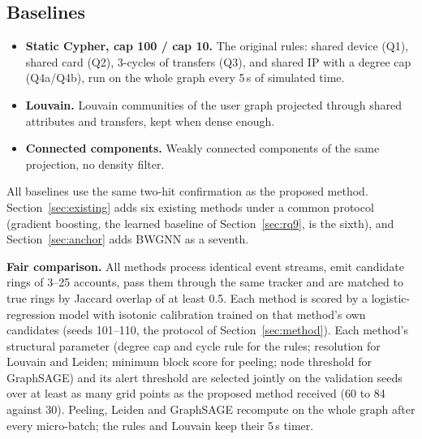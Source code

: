 \subsection{Baselines}
\begin{itemize}
\item \textbf{Static Cypher, cap 100 / cap 10.} The original rules: shared
device (Q1), shared card (Q2), 3-cycles of transfers (Q3), and shared IP with a
degree cap (Q4a/Q4b), run on the whole graph every 5\,s of simulated time.
\item \textbf{Louvain.} Louvain communities \cite{blondel2008louvain} of the
user graph projected through shared attributes and transfers, kept when dense
enough.
\item \textbf{Connected components.} Weakly connected components of the same
projection, no density filter.
\end{itemize}
All baselines use the same two-hit confirmation as the proposed method.
Section~\ref{sec:existing} adds six existing methods under a common protocol (gradient boosting, the learned baseline of Section~\ref{sec:rq9}, is the sixth), and Section~\ref{sec:anchor} adds BWGNN as a seventh.

\textbf{Fair comparison.} All methods process identical event streams, emit
candidate rings of 3--25 accounts, pass them through the same tracker and are
matched to true rings by Jaccard overlap of at least 0.5. Each method is scored
by a logistic-regression model with isotonic calibration trained on that
method's own candidates (seeds 101--110, the protocol of
Section~\ref{sec:method}). Each method's structural parameter (degree cap and
cycle rule for the rules; resolution for Louvain and Leiden; minimum block
score for peeling; node threshold for GraphSAGE) and its alert threshold are
selected jointly on the validation seeds over at least as many grid points as
the proposed method received (60 to 84 against 30). Peeling, Leiden and
GraphSAGE recompute on the whole graph after every micro-batch; the rules and
Louvain keep their 5\,s timer.

